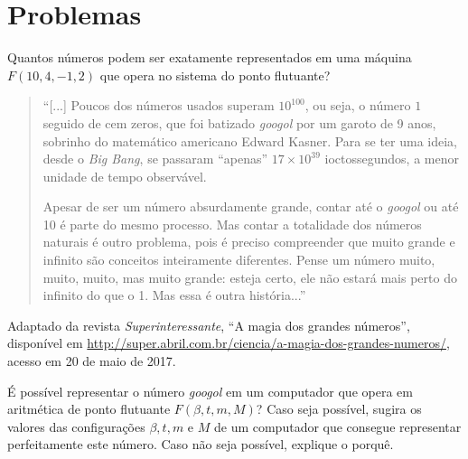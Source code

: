 \section{Problemas}
\begin{ex}
Quantos números podem ser exatamente representados em uma máquina $F(10,4,-1,2)$ que opera no sistema do ponto flutuante?
\end{ex}
\begin{ex}


\begin{quote}
 ``[...] Poucos dos números usados superam $10^{100}$, ou seja, o número $1$ seguido de cem zeros, que foi batizado \emph{googol} por um garoto de 9 anos, sobrinho do matemático americano Edward Kasner. Para se ter uma ideia, desde o \emph{Big Bang}, se passaram ``apenas'' $17\times 10^{39}$ ioctossegundos, a menor unidade de tempo observável. 

Apesar de ser um número absurdamente grande, contar até o \emph{googol} ou até 10 é parte do mesmo processo. Mas contar a totalidade dos números naturais é outro problema, pois é preciso compreender que muito grande e infinito são conceitos inteiramente diferentes. Pense um número muito, muito, muito, mas muito grande: esteja certo, ele não estará mais perto do infinito do que o 1. Mas essa é outra história...''\end{quote}

\begin{flushleft}
Adaptado da revista \emph{Superinteressante}, ``A magia dos grandes números'', disponível em \url{http://super.abril.com.br/ciencia/a-magia-dos-grandes-numeros/}, acesso em 20 de maio de 2017.
\end{flushleft}


É possível representar o número \emph{googol} em um computador que opera em aritmética de ponto flutuante $F(\beta,t,m,M)$? Caso seja possível, sugira os valores das configurações $\beta, t, m$ e $M$ de um computador que consegue representar perfeitamente este número. Caso não seja possível, explique o porquê.

\end{ex}


